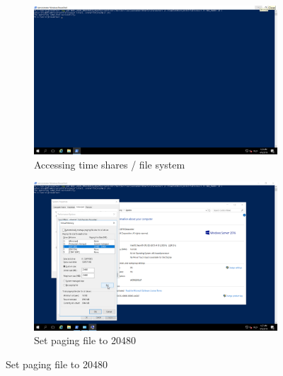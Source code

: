 \begin{figure}[!htb]\ContinuedFloat
    \begin{subfigure}{0.5\textwidth}
        \captionsetup{width=0.8\linewidth}
        \includegraphics[width=0.9\linewidth]{img/Methodologie/Precondition4.png}
        \centering
        \caption{Accessing time shares / file system}
    \end{subfigure}
    \begin{subfigure}{0.5\textwidth}
        \captionsetup{width=0.8\linewidth}
        \includegraphics[width=0.9\linewidth]{img/Methodologie/Precondition5.png} 
        \centering
        \caption{Set paging file to 20480}
    \end{subfigure}
\end{figure}
